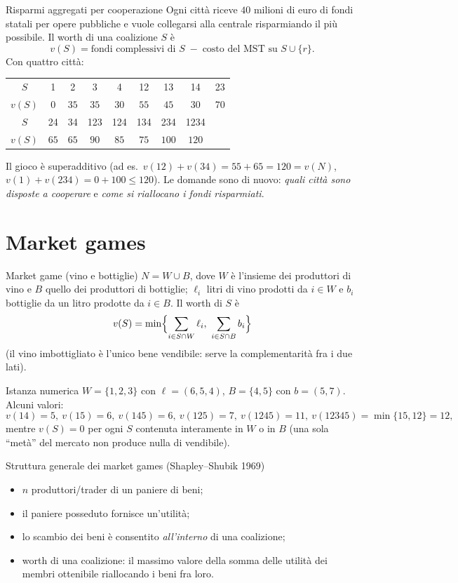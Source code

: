 \documentclass[12pt,a4paper,twoside]{book}
\theoremstyle{plain}
\theoremstyle{definition}
\begin{document}
\begin{exbox}{Risparmi aggregati per cooperazione}
Ogni città riceve $40$ milioni di euro di fondi statali per opere pubbliche e vuole collegarsi alla centrale risparmiando il più possibile. Il worth di una coalizione $S$ è
\[ v(S)=\text{fondi complessivi di } S \;-\; \text{costo del MST su } S\cup\{r\}. \]
Con quattro città:
\begin{center}
\begin{tabular}{ccccccccc}
\toprule
$S$ & 1 & 2 & 3 & 4 & 12 & 13 & 14 & 23\\
$v(S)$ & $0$ & $35$ & $35$ & $30$ & $55$ & $45$ & $30$ & $70$\\
\midrule
$S$ & 24 & 34 & 123 & 124 & 134 & 234 & 1234 & \\
$v(S)$ & $65$ & $65$ & $90$ & $85$ & $75$ & $100$ & $120$ & \\
\bottomrule
\end{tabular}
\end{center}
Il gioco è superadditivo (ad es.\ $v(12)+v(34)=55+65=120=v(N)$, $v(1)+v(234)=0+100\le 120$). Le domande sono di nuovo: \emph{quali città sono disposte a cooperare} e \emph{come si riallocano i fondi risparmiati}.
\end{exbox}

\section{Market games}

\begin{defbox}{Market game (vino e bottiglie)}
$N=W\cup B$, dove $W$ è l'insieme dei produttori di vino e $B$ quello dei produttori di bottiglie; $\ell_i$ litri di vino prodotti da $i\in W$ e $b_i$ bottiglie da un litro prodotte da $i\in B$. Il worth di $S$ è
\[ v(S)=\min\Bigl\{\sum_{i\in S\cap W}\ell_i,\ \sum_{i\in S\cap B}b_i\Bigr\} \]
(il vino imbottigliato è l'unico bene vendibile: serve la complementarità fra i due lati).
\end{defbox}

\begin{exbox}{Istanza numerica}
$W=\{1,2,3\}$ con $\ell=(6,5,4)$, $B=\{4,5\}$ con $b=(5,7)$. Alcuni valori:
\[ v(14)=5,\ v(15)=6,\ v(145)=6,\ v(125)=7,\ v(1245)=11,\ v(12345)=\min\{15,12\}=12, \]
mentre $v(S)=0$ per ogni $S$ contenuta interamente in $W$ o in $B$ (una sola ``metà'' del mercato non produce nulla di vendibile).
\end{exbox}

\begin{defbox}{Struttura generale dei market games (Shapley--Shubik 1969)}
\begin{itemize}
  \item $n$ produttori/trader di un paniere di beni;
  \item il paniere posseduto fornisce un'utilità;
  \item lo scambio dei beni è consentito \emph{all'interno} di una coalizione;
  \item worth di una coalizione: il massimo valore della somma delle utilità dei membri ottenibile riallocando i beni fra loro.
\end{itemize}
\end{defbox}
\end{document}
